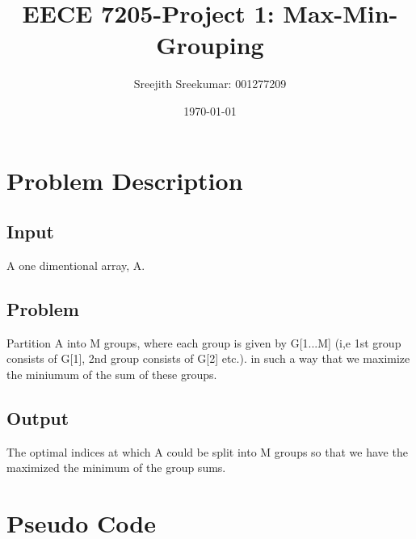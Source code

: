 \documentclass{article}
\title{EECE 7205-Project 1: Max-Min-Grouping}
\author{Sreejith Sreekumar: 001277209}
\date{\today}
\begin{document}
\maketitle
\section{Problem Description}
\subsection{Input}
A one dimentional array, A.

\subsection{Problem}
Partition A into M groups, where each group is given by G[1...M] (i,e 1st group consists of G[1], 2nd group consists of G[2] etc.).
in such a way that we maximize the miniumum of the sum of these groups.

\subsection{Output}
The optimal indices at which A could be split into M groups so that we have the maximized the minimum of the group sums.


\section{Pseudo Code}
\end{document}
